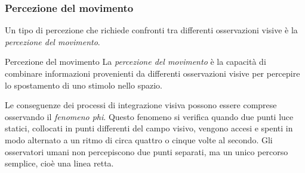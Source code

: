 \documentclass[a4paper]{article}
\begin{document}
\subsubsection{Percezione del movimento}
Un tipo di percezione che richiede confronti tra differenti osservazioni visive è la \emph{percezione del movimento}.
\begin{snippetdefinition}{Percezione del movimento}
    La \emph{percezione del movimento} è la capacità di combinare informazioni provenienti da differenti osservazioni visive per percepire lo spostamento di uno stimolo nello spazio.
\end{snippetdefinition}
Le conseguenze dei processi di integrazione visiva possono essere comprese osservando il \emph{fenomeno phi}. Questo fenomeno si verifica quando due punti luce statici, collocati in punti differenti del campo visivo, vengono accesi e spenti in modo alternato a un ritmo di circa quattro o cinque volte al secondo. Gli osservatori umani non percepiscono due punti separati, ma un unico percorso semplice, cioè una linea retta.
\end{document}
